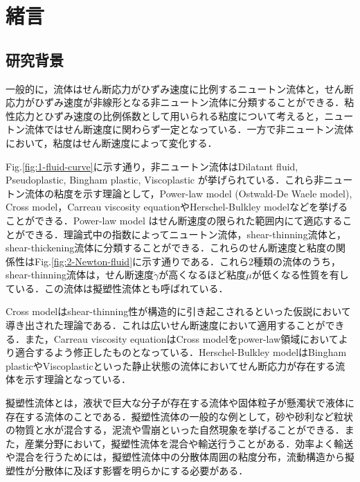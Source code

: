 \section{緒言}

\subsection{研究背景}
一般的に，流体はせん断応力がひずみ速度に比例するニュートン流体と，せん断応力がひずみ速度が非線形となる非ニュートン流体に分類することができる．粘性応力とひずみ速度の比例係数として用いられる粘度について考えると，ニュートン流体ではせん断速度に関わらず一定となっている．一方で非ニュートン流体において，粘度はせん断速度によって変化する．

Fig.\ref{fig:1-fluid-curve}に示す通り，非ニュートン流体はDilatant fluid, Pseudoplastic, Bingham plastic, Viscoplastic が挙げられている．これら非ニュートン流体の粘度を示す理論として，Power-law model (Ostwald-De Waele model), Cross model，Carreau viscosity equationやHerschel-Bulkley modelなどを挙げることができる\cite{ref:1}．Power-law model はせん断速度の限られた範囲内にて適応することができる．理論式中の指数によってニュートン流体，shear-thinning流体と，shear-thickening流体に分類することができる．これらのせん断速度と粘度の関係性はFig.\ref{fig:2-Newton-fluid}に示す通りである．これら2種類の流体のうち，shear-thinning流体は，せん断速度$\dot{\gamma}$が高くなるほど粘度$\mu$が低くなる性質を有している．この流体は擬塑性流体とも呼ばれている．

Cross modelはshear-thinning性が構造的に引き起こされるといった仮説において導き出された理論である．これは広いせん断速度において適用することができる．また，Carreau viscosity equationはCross modelをpower-law領域においてより適合するよう修正したものとなっている．Herschel-Bulkley modelはBingham plasticやViscoplasticといった静止状態の流体においてせん断応力が存在する流体を示す理論となっている\cite{ref:1}．

擬塑性流体とは，液状で巨大な分子が存在する流体や固体粒子が懸濁状で液体に存在する流体のことである．擬塑性流体の一般的な例として，砂や砂利など粒状の物質と水が混合する，泥流や雪崩といった自然現象を挙げることができる．また，産業分野において，擬塑性流体を混合や輸送行うことがある．効率よく輸送や混合を行うためには，擬塑性流体中の分散体周囲の粘度分布，流動構造から擬塑性が分散体に及ぼす影響を明らかにする必要がある．

